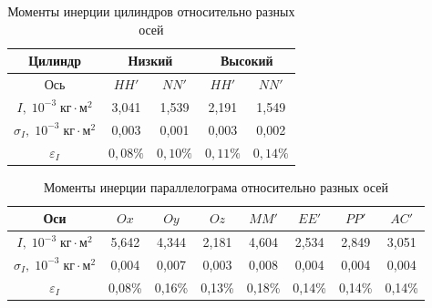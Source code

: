 \documentclass[a4paper, 12pt]{article}
\begin{document}
        \begin{table}[h]
            \centering
            \caption{Моменты инерции цилиндров относительно разных осей}
            \begin{tabular}{|c|cc|cc|}
                \hline
                Цилиндр & 
                \multicolumn{2}{c|}{Низкий} & 
                \multicolumn{2}{c|}{Высокий} \\ 
                \hline
                Ось & 
                \multicolumn{1}{c|}{$HH'$} & $NN'$  & 
                \multicolumn{1}{c|}{$HH'$}  & $NN'$  \\ 
                \hline
                $I,\;10^{-3}\;кг\cdot м^2$ & 
                \multicolumn{1}{c|}{3,041}  & 1,539  & 
                \multicolumn{1}{c|}{2,191}  & 1,549  \\ 
                \hline
                $\sigma_I,\;10^{-3}\;кг\cdot м^2$ & 
                \multicolumn{1}{c|}{0,003}  & 0,001  & 
                \multicolumn{1}{c|}{0,003}  & 0,002  \\ 
                \hline
                $\varepsilon_I$ & 
                \multicolumn{1}{c|}{$0,08\%$} & $0,10\%$ & 
                \multicolumn{1}{c|}{$0,11\%$} & $0,14\%$ \\ 
                \hline
            \end{tabular}
        \end{table}

        \newpage

        \begin{table}[h]
            \centering
            \caption{Моменты инерции параллелограма относительно разных осей}
            \begin{tabular}{|c|c|c|c|c|c|c|c|}
                \hline
                Оси
                & $Ox$   & $Oy$   & $Oz$   & $MM'$  & $EE'$  & $PP'$  & $AC'$  \\ 
                \hline
                $I,\;10^{-3}\;кг\cdot м^2$
                & 5,642  & 4,344  & 2,181  & 4,604  & 2,534  & 2,849  & 3,051  \\ 
                \hline
                $\sigma_I,\;10^{-3}\;кг\cdot м^2$
                & 0,004  & 0,007  & 0,003  & 0,008  & 0,004  & 0,004  & 0,004  \\ 
                \hline
                $\varepsilon_I$
                & 0,08\% & 0,16\% & 0,13\% & 0,18\% & 0,14\% & 0,14\% & 0,14\% \\ 
                \hline
            \end{tabular}
        \end{table}
\end{document}
